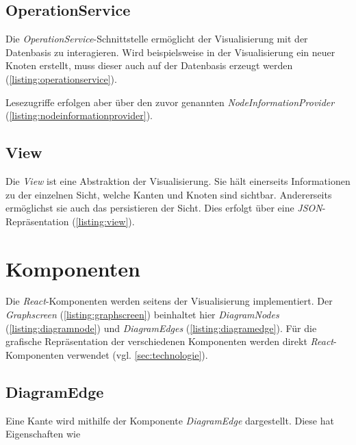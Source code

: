 \subsection{OperationService}
Die \textit{OperationService}-Schnittstelle ermöglicht der Visualisierung mit der Datenbasis zu interagieren. Wird beispielsweise in der Visualisierung ein neuer Knoten erstellt, muss dieser auch auf der Datenbasis erzeugt werden (\autoref{listing:operationservice}). 

Lesezugriffe erfolgen aber über den zuvor genannten \textit{NodeInformationProvider} (\autoref{listing:nodeinformationprovider}).


\subsection{View}
Die \textit{View} ist eine Abstraktion der Visualisierung. Sie hält einerseits Informationen zu der einzelnen Sicht, welche Kanten und Knoten sind sichtbar. Andererseits ermöglichst sie auch das persistieren der Sicht. Dies erfolgt über eine \textit{JSON}-Repräsentation (\autoref{listing:view}).


\section{Komponenten}\label{komponenten}

Die \textit{React}-Komponenten werden seitens der Visualisierung implementiert. Der \textit{Graphscreen} (\autoref{listing:graphscreen}) beinhaltet hier \textit{DiagramNodes} (\autoref{listing:diagramnode}) und \textit{DiagramEdges} (\autoref{listing:diagramedge}). Für die grafische Repräsentation der verschiedenen Komponenten werden direkt \textit{React}-Komponenten verwendet (vgl. \autoref{sec:technologie}).

\subsection{DiagramEdge}
Eine Kante wird mithilfe der Komponente \textit{DiagramEdge} dargestellt. Diese hat Eigenschaften wie 

